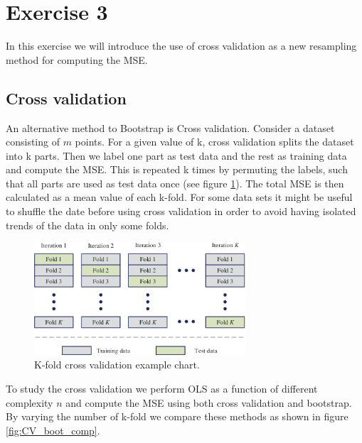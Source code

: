 \documentclass[norsk,a4paper,12pt]{scrartcl}
\begin{document}
\section{Exercise 3}
In this exercise we will introduce the use of cross validation as a new resampling method for computing the MSE.

\subsection{Cross validation}
An alternative method to Bootstrap is Cross validation. Consider a dataset consisting of $m$ points. For a given value of k, cross validation splits the dataset into k parts. Then we label one part as test data and the rest as training data and compute the MSE. This is repeated k times by permuting the labels,  such that all parts are used as test data once (see figure \ref{fig:CV_example}). The total MSE is then calculated as a mean value of each k-fold. For some data sets it might be useful to shuffle the date before using cross validation in order to avoid having isolated trends of the data in only some folds. 

\begin{figure}[H]
    \centering
    \includegraphics[width=0.70\textwidth]{figures/K-fold-cross-validation-method.png}
    \caption{K-fold cross validation example chart.}
    \label{fig:CV_example}
\end{figure}

To study the cross validation we perform OLS as a function of different complexity $n$ and compute the MSE using both cross validation and bootstrap. By varying the number of k-fold we compare these methods as shown in figure \ref{fig:CV_boot_comp}.
\end{document}
